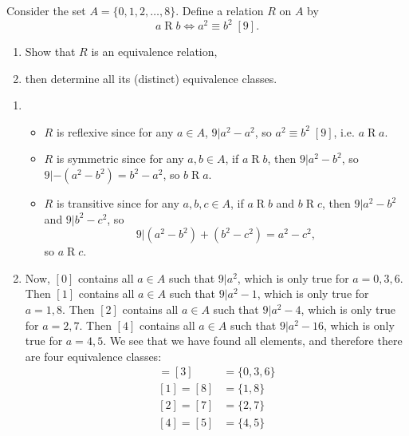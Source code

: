 \documentclass{article}
\theoremstyle{definition}
\begin{document}
\begin{question}
    Consider the set $A = \{0, 1, 2, \dots, 8 \}$. Define a relation $R$ on $A$ by
	\[
	a\mathrel{R}b \iff a^2 \equiv b^2 \; [9].
	\]
	\begin{enumerate}
	\item Show that $R$ is an equivalence relation, 
	\item then determine all its (distinct) equivalence classes.
	\end{enumerate}
\end{question}
\begin{solution}
	\begin{enumerate}
	\item 
	\begin{itemize} 
		\item $ R$ is reflexive since for any $a \in A$, $9 | a^2 - a^2$, so $a^2 \equiv b^2 \; [9]$, i.e. $a \mathrel{R}a$.
		\item $ R$ is symmetric since for any $a,b \in A$, if $a \mathrel{R}b$, then $9 | a^2 - b^2$, so $9 | - (a^2 - b^2) = b^2 - a^2$, so $b \mathrel{R}a$.
		\item $ R$ is transitive since for any $a,b, c \in A$, if $a \mathrel{R}b$ and $b \mathrel{R}c$, then $9 | a^2 - b^2$ and $9 | b^2 - c^2$, so 
		\[
		9 | (a^ 2 - b^2) + (b^2 - c^2) = a^2 - c^2,
		\]
		so $a \mathrel{R}c$.
	\end{itemize}
	\item Now, $[0]$ contains all $a \in A$ such that $9 | a^2$, which is only true for $a = 0, 3, 6$. Then $[1]$ contains all $a \in A$ such that $9 | a^2 - 1$, which is only true for $a = 1, 8$. Then $[2]$ contains all $a \in A$ such that $9 | a^2 - 4$, which is only true for $a = 2, 7$. Then $[4]$ contains all $a \in A$ such that $9 | a^2 - 16$, which is only true for $a = 4, 5$. We see that we have found all elements, and therefore there are four equivalence classes:
		\begin{align*}
		[0] = [3] &= \{ 0, 3, 6 \} \\
		[1] = [8] &= \{ 1, 8 \} \\
		[2] = [7] &= \{ 2, 7 \} \\
		[4] = [5] &= \{ 4, 5 \}
		\end{align*}
	\end{enumerate}
\end{solution}
\end{document}
